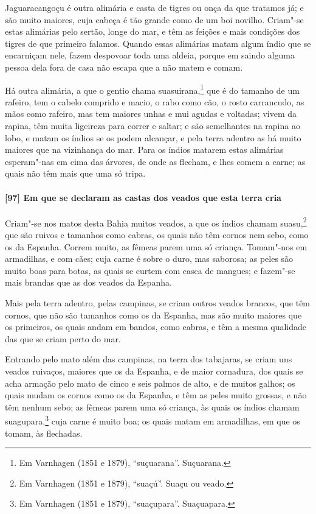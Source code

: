 Jaguaracangoçu é outra alimária e casta de tigres ou onça da que tratamos já; e são muito
maiores, cuja cabeça é tão grande como de um boi novilho. Criam"-se estas alimárias pelo
sertão, longe do mar, e têm as feições e mais condições dos tigres de que primeiro
falamos. Quando essas alimárias matam algum índio que se encarniçam nele, fazem despovoar
toda uma aldeia, porque em saindo alguma pessoa dela fora de casa não escapa que a não
matem e comam.

Há outra alimária, a que o gentio chama suasuirana,\footnote{ Em Varnhagen (1851 e 1879),
``suçuarana''. Suçuarana.} que é do tamanho de um rafeiro, tem o cabelo comprido e macio,
o rabo como cão, o rosto carrancudo, as mãos como rafeiro, mas tem maiores unhas e mui
agudas e voltadas; vivem da rapina, têm muita ligeireza para correr e saltar; e são
semelhantes na rapina ao lobo, e matam os índios se os podem alcançar, e pela terra
adentro as há muito maiores que na vizinhança do mar. Para os índios matarem estas
alimárias esperam"-nas em cima das árvores, de onde as flecham, e lhes comem a carne; as
quais não têm mais que uma só tripa.

\paragraph{[97] Em que se declaram as castas dos veados que esta terra cria}\quad
Criam"-se nos matos desta Bahia muitos veados, a que os índios chamam suasu,\footnote{ Em
Varnhagen (1851 e 1879), ``suaçú''. Suaçu ou veado.} que são ruivos e tamanhos como
cabras, os quais não têm cornos nem sebo, como os da Espanha. Correm muito, as fêmeas
parem uma só criança. Tomam"-nos em armadilhas, e com cães; cuja carne é sobre o duro, mas
saborosa; as peles são muito boas para botas, as quais se curtem com casca de mangues; e
fazem"-se mais brandas que as dos veados da Espanha.

Mais pela terra adentro, pelas campinas, se criam outros veados brancos, que têm cornos,
que não são tamanhos como os da Espanha, mas são muito maiores que os primeiros, os quais
andam em bandos, como cabras, e têm a mesma qualidade das que se criam perto do mar.

Entrando pelo mato além das campinas, na terra dos tabajaras, se criam uns veados
ruivaços, maiores que os da Espanha, e de maior cornadura, dos quais se acha armação pelo
mato de cinco e seis palmos de alto, e de muitos galhos; os quais mudam os cornos como os
da Espanha, e têm as peles muito grossas, e não têm nenhum sebo; as fêmeas parem uma só
criança, às quais os índios chamam suagupara,\footnote{ Em Varnhagen (1851 e 1879),
``suaçupara''. Suaçuapara.} cuja carne é muito boa; os quais matam em armadilhas, em que
os tomam, às flechadas.

